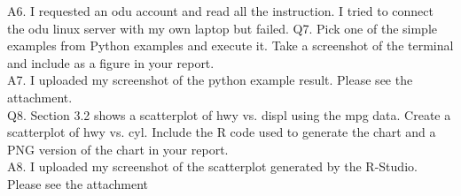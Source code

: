 \documentclass{article}
\begin{document}
A6. I requested an odu account and read all the instruction. I tried to connect the odu linux server with my own laptop but failed.  
Q7. Pick one of the simple examples from Python examples and execute it. Take a screenshot of the terminal and include as a figure in your report.\\

A7. I uploaded my screenshot of the python example result. Please see the attachment.\\


Q8. Section 3.2 shows a scatterplot of hwy vs. displ using the mpg data. Create a scatterplot of hwy vs. cyl. Include the R code used to generate the chart and a PNG version of the chart in your report.\\

A8. I uploaded my screenshot of the scatterplot generated by the R-Studio. Please see the attachment
\end{document}
